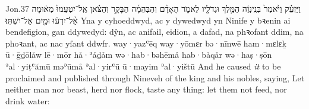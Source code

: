 \begin{example}{Jon.}{3}{7}{}{}
	\quoling
	{וַיַּזְעֵ֗ק וַיֹּ֙אמֶר֙ בְּנִֽינְוֵ֔ה  הַמֶּ֛לֶךְ וּגְדֹלָ֖יו לֵאמֹ֑ר הָאָדָ֨ם וְהַבְּהֵמָ֜ה הַבָּקָ֣ר וְהַצֹּ֗אן אַֽל־יִטְעֲמוּ֙ מְא֔וּמָה אַ֨ל־יִרְע֔וּ וּמַ֖יִם אַל־יִשְׁתּֽוּ׃}
	{Yna y cyhoeddwyd, ac y dywedwyd yn Ninife  y bꝛenin ai bendefigion, gan ddywedyd: dŷn, ac anifail, eidion, a dafad, na phꝛofant ddim, na phoꝛant, ac nac yſant ddwfr.}
	{way·yazʿēq way·yōmɛr bə·nīnwē  ham·mɛlɛḵ ū·ḡḏōlåw lē·mōr hå·ʾåḏåm wə·hab·bəhēmå hab·båqår wə·haṣ·ṣōn ʾal·yiṭʿămū məʾūmå ʾal·yirʿū ū·mayim ʾal·yištū}
	{And he caused \textit{it} to be proclaimed and published through Nineveh  of the king and his nobles, saying, Let neither man nor beast, herd nor flock, taste any thing: let them not feed, nor drink water:}
\end{example}
